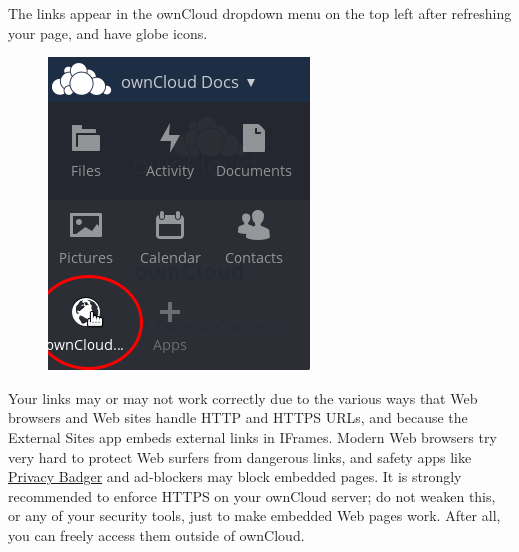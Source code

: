 \documentclass[letterpaper,10pt,english]{sphinxmanual}
\begin{document}
The links appear in the ownCloud dropdown menu on the top left after
refreshing your page, and have globe icons.
\begin{figure}[htbp]
\centering

\includegraphics{external-sites-3.png}
\end{figure}

Your links may or may not work correctly due to the various ways that Web
browsers and Web sites handle HTTP and HTTPS URLs, and because the External
Sites app embeds external links in IFrames. Modern Web browsers try very hard
to protect Web surfers from dangerous links, and safety apps like
\href{https://www.eff.org/privacybadger}{Privacy Badger} and ad-blockers may block
embedded pages. It is strongly recommended to enforce HTTPS on your ownCloud
server; do not weaken this, or any of your security tools, just to make
embedded Web pages work. After all, you can freely access them outside of
ownCloud.
\end{document}

